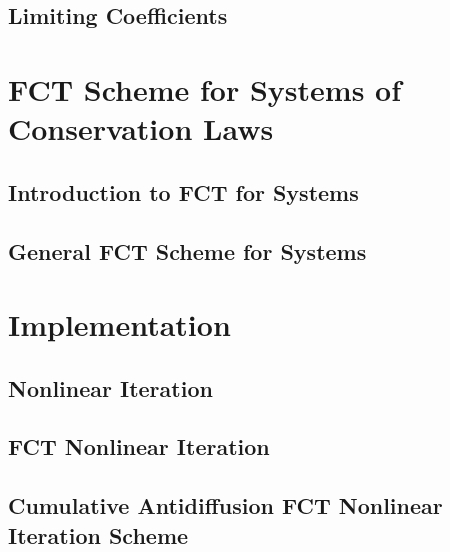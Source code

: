 \subsection{Limiting Coefficients\label{sec:limiting_coefficients_scalar}}
  
\section{FCT Scheme for Systems of Conservation Laws\label{sec:fct_systems}}
\subsection{Introduction to FCT for Systems\label{sec:fct_systems_introduction}}
  
\subsection{General FCT Scheme for Systems\label{sec:fct_systems_scheme}}
  
\section{Implementation\label{sec:implementation}}
\subsection{Nonlinear Iteration\label{sec:nonlinear_iteration}}
  
\subsection{FCT Nonlinear Iteration
  \label{sec:fct_nonlinear_iteration}}
  
\subsection{Cumulative Antidiffusion FCT Nonlinear Iteration Scheme
  \label{sec:cumulative_antidiffusion}}
  

